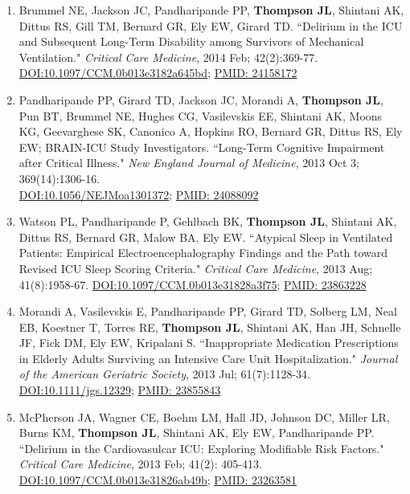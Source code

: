 \documentclass[5pt]{article}
\begin{document}
\begin{enumerate}
\item Brummel NE, Jackson JC, Pandharipande PP, \textbf{Thompson JL}, Shintani AK, Dittus RS, Gill TM, Bernard GR, Ely EW, Girard TD. ``Delirium in the ICU and Subsequent Long-Term Disability among Survivors of Mechanical Ventilation." \emph{Critical Care Medicine}, 2014 Feb; 42(2):369-77.\\ \href{https://doi.org/10.1097/CCM.0b013e3182a645bd}{DOI:10.1097/CCM.0b013e3182a645bd}; \href{https://www.ncbi.nlm.nih.gov/pubmed/24158172}{PMID: 24158172}
\item Pandharipande PP, Girard TD, Jackson JC, Morandi A, \textbf{Thompson JL}, Pun BT, Brummel NE, Hughes CG, Vasilevskis EE, Shintani AK, Moons KG, Geevarghese SK, Canonico A, Hopkins RO, Bernard GR, Dittus RS, Ely EW; BRAIN-ICU Study Investigators. ``Long-Term Cognitive Impairment after Critical Illness." \emph{New England Journal of Medicine}, 2013 Oct 3; 369(14):1306-16.\\ \href{https://doi.org/10.1056/NEJMoa1301372}{DOI:10.1056/NEJMoa1301372}; \href{https://www.ncbi.nlm.nih.gov/pubmed/24088092}{PMID: 24088092}
\item Watson PL, Pandharipande P, Gehlbach BK, \textbf{Thompson JL}, Shintani AK, Dittus RS, Bernard GR, Malow BA, Ely EW. ``Atypical Sleep in Ventilated Patients: Empirical Electroencephalography Findings and the Path toward Revised ICU Sleep Scoring Criteria." \emph{Critical Care Medicine}, 2013 Aug; 41(8):1958-67. \href{https://doi.org/10.1097/CCM.0b013e31828a3f75}{DOI:10.1097/CCM.0b013e31828a3f75}; \href{https://www.ncbi.nlm.nih.gov/pubmed/23863228}{PMID: 23863228}
\item Morandi A, Vasilevskis E, Pandharipande PP, Girard TD, Solberg LM, Neal EB, Koestner T, Torres RE, \textbf{Thompson JL}, Shintani AK, Han JH, Schnelle JF, Fick DM, Ely EW, Kripalani S. ``Inappropriate Medication Prescriptions in Elderly Adults Surviving an Intensive Care Unit Hospitalization." \emph{Journal of the American Geriatric Society}, 2013 Jul; 61(7):1128-34. \href{https://doi.org/10.1111/jgs.12329}{DOI:10.1111/jgs.12329}; \href{https://www.ncbi.nlm.nih.gov/pubmed/23855843}{PMID: 23855843}
\item McPherson JA, Wagner CE, Boehm LM, Hall JD, Johnson DC, Miller LR, Burns KM, \textbf{Thompson JL}, Shintani AK, Ely EW, Pandharipande PP. ``Delirium in the Cardiovasulcar ICU: Exploring Modifiable Risk Factors." \emph{Critical Care Medicine}, 2013 Feb; 41(2): 405-413. \href{https://doi.org/10.1097/CCM.0b013e31826ab49b}{DOI:10.1097/CCM.0b013e31826ab49b}; \href{https://www.ncbi.nlm.nih.gov/pubmed/23263581}{PMID: 23263581}

\end{enumerate}
\end{document}
